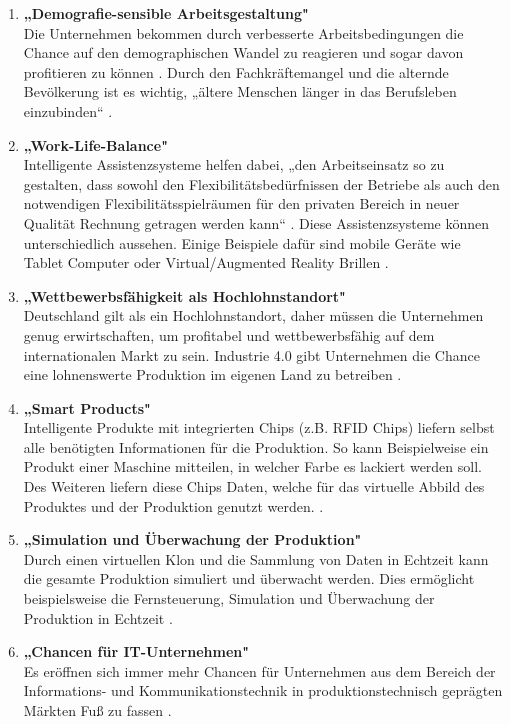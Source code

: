 \begin{enumerate}
	\item \textbf{„Demografie-sensible Arbeitsgestaltung"} \cite[S.20]{12} \\
	Die Unternehmen bekommen durch verbesserte Arbeitsbedingungen die Chance auf den 
	demographischen Wandel zu reagieren und sogar davon profitieren zu können \cite[S.20]{12}. Durch den Fachkräftemangel und die alternde Bevölkerung ist es wichtig,	„ältere Menschen länger in das Berufsleben einzubinden“ \cite{6}. \newpage
	\item \textbf{„Work-Life-Balance"} \cite[S.20]{12} \\
	Intelligente Assistenzsysteme helfen dabei, „den Arbeitseinsatz so zu gestalten, dass sowohl
	den Flexibilitätsbedürfnissen der Betriebe als auch den notwendigen Flexibilitätsspielräumen
	für den privaten Bereich in neuer Qualität Rechnung getragen werden kann“ \cite[S.20]{12}. Diese Assistenzsysteme können unterschiedlich aussehen. Einige Beispiele dafür sind mobile Geräte wie Tablet Computer oder Virtual/Augmented Reality Brillen \cite{6}.
	\item \textbf{„Wettbewerbsfähigkeit als Hochlohnstandort"} \cite[S.20]{12} \\
	Deutschland gilt als ein Hochlohnstandort, daher müssen die Unternehmen genug erwirtschaften, um profitabel und wettbewerbsfähig auf dem internationalen Markt zu sein. Industrie 4.0 gibt Unternehmen die Chance eine lohnenswerte Produktion im eigenen Land zu betreiben \cite[S.20]{12}.
	\item \textbf{„Smart Products"} \cite{6} \\
	Intelligente Produkte mit integrierten Chips (z.B. RFID Chips) liefern selbst alle benötigten
	Informationen für die Produktion. So kann Beispielweise ein Produkt einer Maschine 
	mitteilen, in welcher Farbe es lackiert werden soll. Des Weiteren liefern diese Chips Daten, 
	welche für das virtuelle Abbild des Produktes und der Produktion genutzt werden. \cite{6}.
	\item \textbf{„Simulation und Überwachung der Produktion"} \cite{6} \\
	Durch einen virtuellen Klon und die Sammlung von Daten in Echtzeit kann die gesamte
	Produktion simuliert und überwacht werden. Dies ermöglicht beispielsweise die
	Fernsteuerung, Simulation und Überwachung der Produktion in Echtzeit \cite{6}.
	\item \textbf{„Chancen für IT-Unternehmen"} \cite[S.7]{2} \\
	Es eröffnen sich immer mehr Chancen für Unternehmen aus dem Bereich der Informations- und Kommunikationstechnik in produktionstechnisch geprägten Märkten Fuß zu fassen \cite[S.7]{2}.
\end{enumerate}

